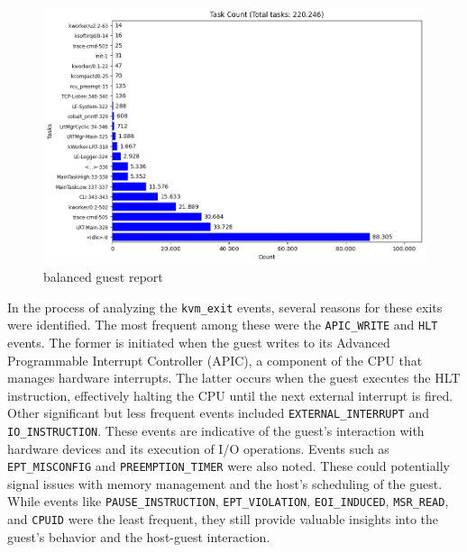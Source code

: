 \documentclass[MMR,Master,english]{twbook}
\begin{document}
\begin{figure}[H]
	\centering
	\includegraphics[width=1.0\columnwidth]{img/performance/results_guest_report.png}
	\caption[balanced guest report]{balanced guest report}
	\label{fig:performance_kvm_guest}
\end{figure}
\clearpage

\noindent In the process of analyzing the \texttt{kvm\_exit} events, several reasons for these exits were identified. The most frequent among these were the \texttt{APIC\_WRITE} and \texttt{HLT} events. The former is initiated when the guest writes to its Advanced Programmable Interrupt Controller (APIC), a component of the CPU that manages hardware interrupts. The latter occurs when the guest executes the HLT instruction, effectively halting the CPU until the next external interrupt is fired. Other significant but less frequent events included \texttt{EXTERNAL\_INTERRUPT} and \texttt{IO\_INSTRUCTION}. These events are indicative of the guest's interaction with hardware devices and its execution of I/O operations. Events such as \texttt{EPT\_MISCONFIG} and \texttt{PREEMPTION\_TIMER} were also noted. These could potentially signal issues with memory management and the host's scheduling of the guest. While events like \texttt{PAUSE\_INSTRUCTION}, \texttt{EPT\_VIOLATION}, \texttt{EOI\_INDUCED}, \texttt{MSR\_READ}, and \texttt{CPUID} were the least frequent, they still provide valuable insights into the guest's behavior and the host-guest interaction.
\end{document}
